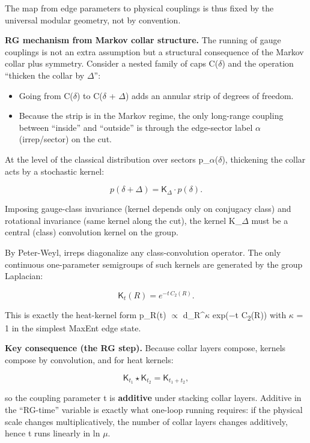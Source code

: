 \documentclass[11pt,a4paper]{article}
\theoremstyle{remark}
\providecommand{\tightlist}{%
  \setlength{\itemsep}{0pt}\setlength{\parskip}{0pt}}
\begin{document}
The map from edge parameters to physical couplings is thus fixed by the
universal modular geometry, not by convention.

\textbf{RG mechanism from Markov collar structure.} The running of gauge couplings is not an extra assumption but a structural consequence of the Markov collar plus symmetry. Consider a nested family of caps C(\ensuremath{\delta}) and the operation ``thicken the collar by \ensuremath{\Delta}'':

\begin{itemize}
\tightlist
\item
  Going from C(\ensuremath{\delta}) to C(\ensuremath{\delta} + \ensuremath{\Delta}) adds an annular strip of degrees of freedom.
\item
  Because the strip is in the Markov regime, the only long-range coupling between ``inside'' and ``outside'' is through the edge-sector label \ensuremath{\alpha} (irrep/sector) on the cut.
\end{itemize}

At the level of the classical distribution over sectors p\_\ensuremath{\alpha}(\ensuremath{\delta}), thickening the collar acts by a stochastic kernel:

\[
p(\delta + \Delta) = \mathsf{K}_\Delta \cdot p(\delta).
\]

Imposing gauge-class invariance (kernel depends only on conjugacy class) and rotational invariance (same kernel along the cut), the kernel K\_\ensuremath{\Delta} must be a central (class) convolution kernel on the group.

By Peter-Weyl, irreps diagonalize any class-convolution operator. The only continuous one-parameter semigroups of such kernels are generated by the group Laplacian:

\[
\mathsf{K}_t(R) = e^{-t \, C_2(R)}.
\]

This is exactly the heat-kernel form p\_R(t) \ensuremath{\propto} d\_R\^{}\ensuremath{\kappa} exp(\ensuremath{-}t C\textsubscript{2}(R)) with \ensuremath{\kappa} = 1 in the simplest MaxEnt edge state.

\textbf{Key consequence (the RG step).} Because collar layers compose, kernels compose by convolution, and for heat kernels:

\[
\mathsf{K}_{t_1} \star \mathsf{K}_{t_2} = \mathsf{K}_{t_1 + t_2},
\]

so the coupling parameter t is \textbf{additive} under stacking collar layers. Additive in the ``RG-time'' variable is exactly what one-loop running requires: if the physical scale changes multiplicatively, the number of collar layers changes additively, hence t runs linearly in ln \ensuremath{\mu}.
\end{document}
